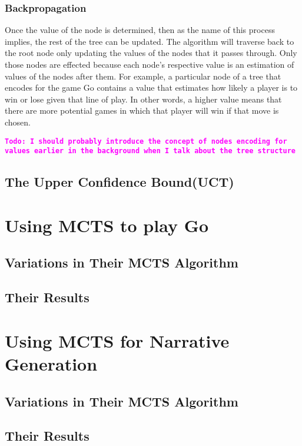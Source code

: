 \documentclass{sig-alternate}
\newcommand{\comment}[1]{{\bf \tt  {#1}}}
\newcommand{\todo}[1]{\textcolor{magenta}{\comment{Todo: {#1}}}}
\begin{document}
\subsubsection{Backpropagation}
Once the value of the node is determined, then as the name of this process implies, the rest of the tree can be updated. The algorithm will traverse back to the root node only updating the values of the nodes that it passes through. Only those nodes are effected because each node's respective value is an estimation of values of the nodes after them. For example, a particular node of a tree that encodes for the game Go contains a value that estimates how likely a player is to win or lose given that line of play. In other words, a higher value means that there are more potential games in which that player will win if that move is chosen.

\todo{I should probably introduce the concept of nodes encoding for values earlier in the background when I talk about the tree structure}

\subsection{The Upper Confidence Bound(UCT)}

\section{Using MCTS to play Go}

\subsection{Variations in Their MCTS Algorithm}

\subsection{Their Results}

\section{Using MCTS for Narrative Generation}

\subsection{Variations in Their MCTS Algorithm}

\subsection{Their Results}
\end{document}
